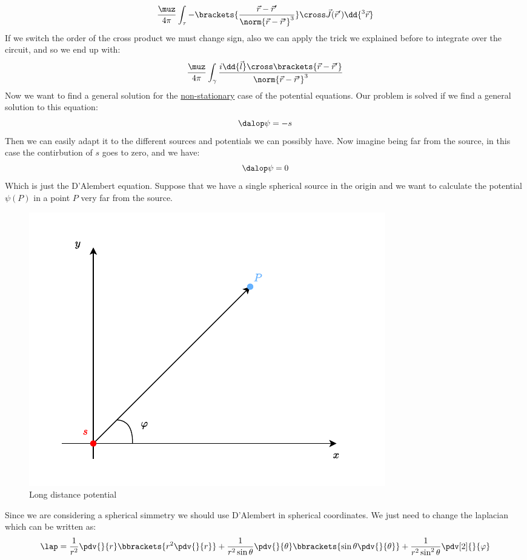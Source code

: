 \begin{equation}
  \dfrac{\muz}{4 \pi }\int_{\tau}-\brackets{\dfrac{\vec{r}-\vec{r}'}{\norm{\vec{r}-\vec{r}'}^3}} \cross \vec{J}(\vec{r}')\dd{^3 \vec{r}}
\end{equation}
If we switch the order of the cross product we must change sign, also we can apply the trick we explained before to integrate over the circuit, and so we end up with:
\begin{equation}
  \dfrac{\muz}{4 \pi }\int_{\gamma}\dfrac{i \dd{\vec{l}} \cross \brackets{\vec{r}-\vec{r}'}}{\norm{\vec{r}-\vec{r}'}^3}
\end{equation}
Now we want to find a general solution for the \underline{non-stationary} case of the potential equations. Our problem is solved if we find a general solution to this equation:
\begin{equation}
  \dalop \psi = -s
\end{equation}
Then we can easily adapt it to the different sources and potentials we can possibly have. Now imagine being far from the source, in this case the contirbution of $s$ goes to zero, and we have:
\begin{equation}
  \dalop \psi = 0
\end{equation}
Which is just the D'Alembert equation. Suppose that we have a single spherical source in the origin and we want to calculate the potential $\psi (P)$ in a point $P$ very far from the source.
\begin{figure}[H]
  \centering
  \includegraphics[width=0.7\linewidth]{res/svg/long_distance_potential.drawio}
  \caption{Long distance potential}
\end{figure}
Since we are considering a spherical simmetry we should use D'Alembert in spherical coordinates. We just need to change the laplacian which can be written as:
\begin{equation}
  \lap = \dfrac{1}{r^2} \pdv{}{r}\bbrackets{r^2 \pdv{}{r}} + \dfrac{1}{r^2 \sin{\theta}} \pdv{}{\theta}\bbrackets{\sin{\theta} \pdv{}{\theta}} + \dfrac{1}{r^2 \sin^2{\theta}} \pdv[2]{}{\varphi}
\end{equation}
